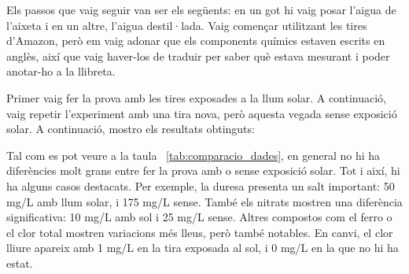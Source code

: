 Els passos que vaig seguir van ser els següents: en un got hi vaig posar l’aigua de l’aixeta i en un altre, l’aigua destil·lada. Vaig començar utilitzant les tires d’Amazon, però em vaig adonar que els components químics estaven escrits en anglès, així que vaig haver-los de traduir per saber què estava mesurant i poder anotar-ho a la llibreta.

Primer vaig fer la prova amb les tires exposades a la llum solar. A continuació, vaig repetir l’experiment amb una tira nova, però aquesta vegada sense exposició solar. A continuació, mostro els resultats obtinguts:
\begin{table}[H]
\centering
{}
\caption{Resultats del primer experiment}
\label{tab:comparacio_dades}
\end{table}

Tal com es pot veure a la taula~ \ref{tab:comparacio_dades}, en general no hi ha diferències molt grans entre fer la prova amb o sense exposició solar. Tot i així, hi ha alguns casos destacats. Per exemple, la duresa presenta un salt important: 50 mg/L amb llum solar, i 175 mg/L sense. També els nitrats mostren una diferència significativa: 10 mg/L amb sol i 25 mg/L sense. Altres compostos com el ferro o el clor total mostren variacions més lleus, però també notables. En canvi, el clor lliure apareix amb 1 mg/L en la tira exposada al sol, i 0 mg/L en la que no hi ha estat.

